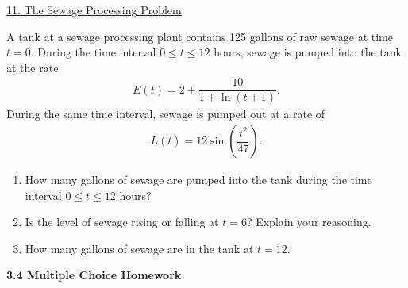 \begin{center}
    \underline{11. The Sewage Processing Problem}
\end{center}

A tank at a sewage processing plant contains 125 gallons of raw sewage at time $t = 0$. During the time interval $0 \leq t \leq 12$ hours, sewage is pumped into the tank at the rate \begin{align*}
    E(t) = 2 + \dfrac{10}{1 + \ln(t + 1)}.
\end{align*}
During the same time interval, sewage is pumped out at a rate of \begin{align*}
    L(t) = 12\sin \left(\dfrac{t^2}{47}\right).
\end{align*}
\begin{enumerate}[label=\hspace{11pt}(\alph*), align=left, leftmargin=*, labelsep=0.25em]
    \item How many gallons of sewage are pumped into the tank during the time interval $0 \leq t \leq 12$ hours?
    \item Is the level of sewage rising or falling at $t = 6$? Explain your reasoning.
    \item How many gallons of sewage are in the tank at $t = 12$.
\end{enumerate} \vspace{11pt}

\textbf{\large{3.4 Multiple Choice Homework}} \par

